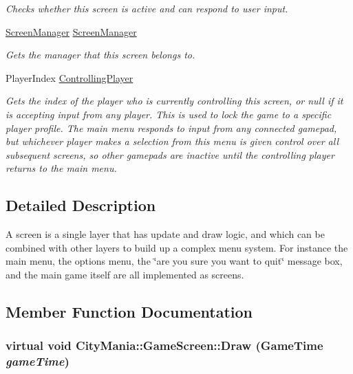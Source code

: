 \begin{DoxyCompactItemize}
\begin{DoxyCompactList}\small\item\em Checks whether this screen is active and can respond to user input. \item\end{DoxyCompactList}\item 
\hyperlink{classCityMania_1_1ScreenManager}{ScreenManager} \hyperlink{classCityMania_1_1GameScreen_ac15df0115281ac945ef2f4d30daa68d5}{ScreenManager}
\begin{DoxyCompactList}\small\item\em Gets the manager that this screen belongs to. \item\end{DoxyCompactList}\item 
PlayerIndex \hyperlink{classCityMania_1_1GameScreen_a71ed7a4240f030e9e0eb88d107d891b1}{ControllingPlayer}
\begin{DoxyCompactList}\small\item\em Gets the index of the player who is currently controlling this screen, or null if it is accepting input from any player. This is used to lock the game to a specific player profile. The main menu responds to input from any connected gamepad, but whichever player makes a selection from this menu is given control over all subsequent screens, so other gamepads are inactive until the controlling player returns to the main menu. \item\end{DoxyCompactList}\end{DoxyCompactItemize}


\subsection{Detailed Description}
A screen is a single layer that has update and draw logic, and which can be combined with other layers to build up a complex menu system. For instance the main menu, the options menu, the \char`\"{}are you sure you
        want to quit\char`\"{} message box, and the main game itself are all implemented as screens. 

\subsection{Member Function Documentation}
\hypertarget{classCityMania_1_1GameScreen_a28fbcdba21da5e606d32d87b18bcdf29}{
\subsubsection[{Draw}]{\setlength{\rightskip}{0pt plus 5cm}virtual void CityMania::GameScreen::Draw (GameTime {\em gameTime})}}
\label{classCityMania_1_1GameScreen_a28fbcdba21da5e606d32d87b18bcdf29}


